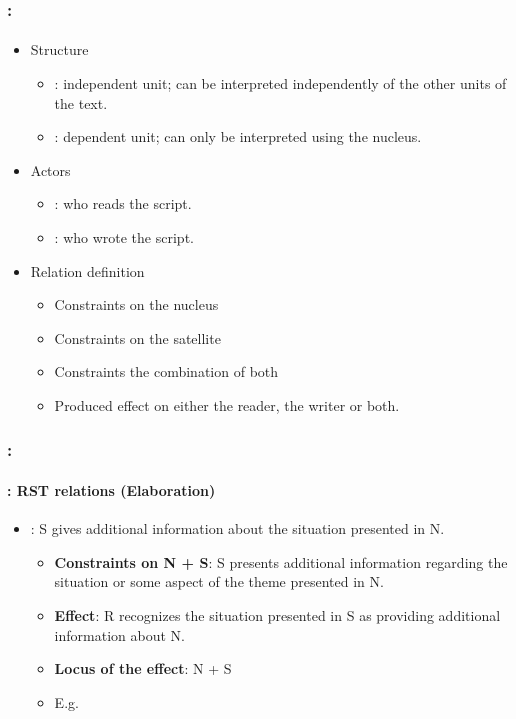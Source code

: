 \documentclass[xcolor=table]{beamer}
\begin{document}
\begin{frame}
	\frametitle{\insertshortsubtitle: \insertsection}
	\framesubtitle{\insertsubsection}
	
	\begin{itemize}
		\item Structure  
		\begin{itemize}
			\item {} : independent unit; can be interpreted independently of the other units of the text.
			\item {}: dependent unit; can only be interpreted using the nucleus.
		\end{itemize}
		\item Actors
		\begin{itemize}
			\item {}: who reads the script.
			\item {}: who wrote the script.
		\end{itemize}
		\item Relation definition
		\begin{itemize}
			\item Constraints on the nucleus
			\item Constraints on the satellite 
			\item Constraints the combination of both 
			\item Produced effect on either the reader, the writer or both.
		\end{itemize}
	\end{itemize}
	
\end{frame}

\begin{frame}
	\frametitle{\insertshortsubtitle: \insertsection}
	\framesubtitle{\insertsubsection: RST relations (Elaboration)}
	
	\begin{itemize}
		\item {}: S gives additional information about the situation presented in N.
		\begin{itemize}
			\item \textbf{Constraints on N + S}: S presents additional information regarding the situation or some aspect of the theme presented in N.
			\item \textbf{Effect}: R recognizes the situation presented in S as providing additional information about N. 
			\item \textbf{Locus of the effect}: N + S
			\item E.g. 
		\end{itemize}
	\end{itemize}
	
\end{frame}
\end{document}
